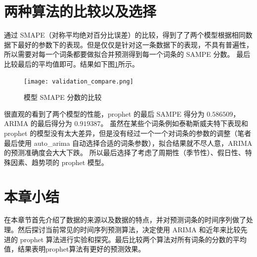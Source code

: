 \section{两种算法的比较以及选择}

通过 SMAPE（对称平均绝对百分比误差）的比较，得到了了两个模型根据相同数据下最好的参数下的表现。但是仅仅是针对这一条数据下的表现，不具有普遍性，所以需要对每一个词条都要做拟合并预测得到每一个词条的 SAMPE 分数。
最后比较最后的平均值即可。结果如下图\ref{compare_model2}所示。

\begin{figure}[htbp]
  \centering
  \texttt{[image: validation\_compare.png]}
  \caption{模型 SMAPE 分数的比较}
  \label{compare_model2}
\end{figure}

很直观的看到了两个模型的性能，prophet 的最后 SAMPE 得分为 $0.586509$，ARIMA 的最后得分为 $0.919387$。
虽然在某些个词条例如泰勒斯威夫特下表现和 prophet 的模型没有太大差异，但是没有经过一个一个对词条的参数的调整（笔者最后使用 auto\_arima 自动选择合适的词条参数），拟合结果就不尽人意，ARIMA 的预测准确度会大大下跌。
所以最后选择了考虑了周期性（季节性）、假日性、特殊因素、趋势项的 prophet 模型。

\section{本章小结}

在本章节首先介绍了数据的来源以及数据的特点，并对预测词条的时间序列做了处理。然后探讨当前常见的时间序列预测算法，决定使用 ARIMA 和近年来比较先进的 prophet 算法进行实验和探究。最后比较两个算法对所有词条的分数的平均值，结果表明prophet算法有更好的预测效果。
